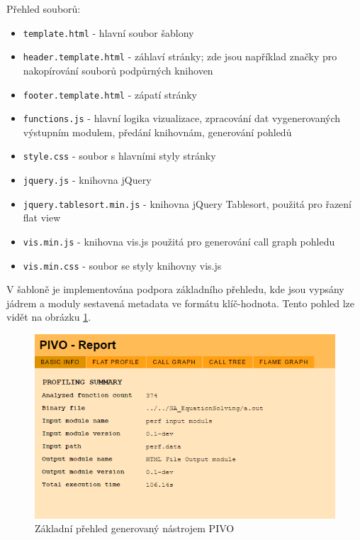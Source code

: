 \documentclass[czech,BP]{thesiskiv}
\begin{document}
Přehled souborů:
\begin{itemize}
\item \texttt{template.html} - hlavní soubor šablony
\item \texttt{header.template.html} - záhlaví stránky; zde jsou například značky pro nakopírování souborů podpůrných knihoven
\item \texttt{footer.template.html} - zápatí stránky
\item \texttt{functions.js} - hlavní logika vizualizace, zpracování dat vygenerovaných výstupním modulem, předání knihovnám, generování pohledů
\item \texttt{style.css} - soubor s hlavními styly stránky
\item \texttt{jquery.js} - knihovna jQuery
\item \texttt{jquery.tablesort.min.js} - knihovna jQuery Tablesort, použitá pro řazení flat view
\item \texttt{vis.min.js} - knihovna vis.js použitá pro generování call graph pohledu
\item \texttt{vis.min.css} - soubor se styly knihovny vis.js
\end{itemize}

V šabloně je implementována podpora základního přehledu, kde jsou vypsány jádrem a moduly sestavená metadata ve formátu klíč-hodnota. Tento pohled lze vidět na obrázku \ref{obr:implbasic}.

\begin{figure}[h]
    \centering
    \includegraphics[interpolate,width=1.0\textwidth]{img/pivo_basic.png}
    \caption{Základní přehled generovaný nástrojem PIVO}
    \label{obr:implbasic}
\end{figure}
\end{document}
